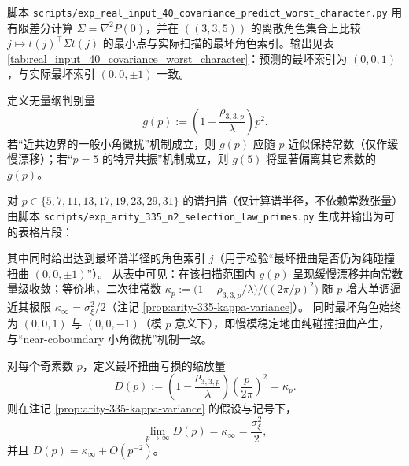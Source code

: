 \begin{remark}\label{rem:arity-335-worst-direction-cov-check}
脚本 \texttt{scripts/exp\_real\_input\_40\_covariance\_predict\_worst\_character.py} 用有限差分计算 \(\Sigma=\nabla^2P(0)\)，并在 \(((3,3,5))\) 的离散角色集合上比较
\(
j\mapsto t(j)^\top\Sigma t(j)
\)
的最小点与实际扫描的最坏角色索引。输出见表 \ref{tab:real_input_40_covariance_worst_character}：预测的最坏索引为 \((0,0,1)\)，与实际最坏索引 \((0,0,\pm1)\) 一致。
\end{remark}



\begin{remark}\label{rem:arity-335-selection-law-gp}
定义无量纲判别量
$$
g(p):=\left(1-\frac{\rho_{3,3,p}}{\lambda}\right)p^2.
$$
若“近共边界的一般小角微扰”机制成立，则 \(g(p)\) 应随 \(p\) 近似保持常数（仅作缓慢漂移）；若“\(p=5\) 的特异共振”机制成立，则 \(g(5)\) 将显著偏离其它素数的 \(g(p)\)。

对 \(p\in\{5,7,11,13,17,19,23,29,31\}\) 的谱扫描（仅计算谱半径，不依赖常数张量）由脚本
\texttt{scripts/exp\_arity\_335\_n2\_selection\_law\_primes.py}
生成并输出为可 \verb|| 的表格片段：

其中同时给出达到最坏谱半径的角色索引 \(j\)（用于检验“最坏扭曲是否仍为纯碰撞扭曲 \((0,0,\pm1)\)”）。
从表中可见：在该扫描范围内 \(g(p)\) 呈现缓慢漂移并向常数量级收敛；等价地，二次律常数 \(\kappa_p:=\bigl(1-\rho_{3,3,p}/\lambda\bigr)/\bigl((2\pi/p)^2\bigr)\) 随 \(p\) 增大单调逼近其极限 \(\kappa_\infty=\sigma_\xi^2/2\)（注记 \ref{prop:arity-335-kappa-variance}）。
同时最坏角色始终为 \((0,0,1)\) 与 \((0,0,-1)\)（模 \(p\) 意义下），即慢模稳定地由纯碰撞扭曲产生，与“near-coboundary 小角微扰”机制一致。
\end{remark}

\begin{remark}\label{thm:arity-335-limit-law}
对每个奇素数 \(p\)，定义最坏扭曲亏损的缩放量
$$
D(p)
:=
\left(1-\frac{\rho_{3,3,p}}{\lambda}\right)\left(\frac{p}{2\pi}\right)^2
=\kappa_p.
$$
则在注记 \ref{prop:arity-335-kappa-variance} 的假设与记号下，
$$
\lim_{p\to\infty}D(p)=\kappa_\infty=\frac{\sigma_\xi^2}{2},
$$
并且 \(D(p)=\kappa_\infty+O(p^{-2})\)。
\end{remark}

